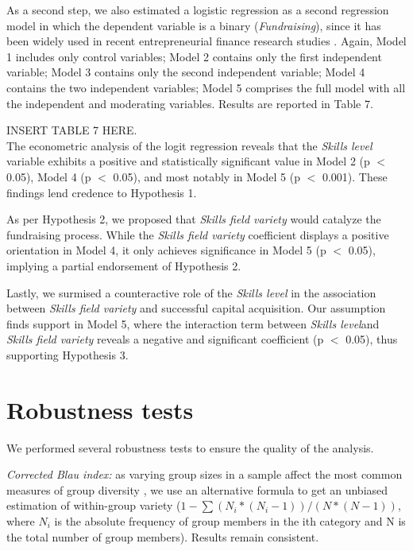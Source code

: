 \documentclass[12pt]{article}
\begin{document}
As a second step, we also estimated a logistic regression as a second regression model in which the dependent variable is a binary (\textit{Fundraising}), since it has been widely used in recent entrepreneurial finance research studies \citep{ahlers2015signaling, islam2018signaling}. Again, Model 1 includes only control variables; Model 2 contains only the first independent variable; Model 3 contains only the second independent variable; Model 4 contains the two independent variables; Model 5 comprises the full model with all the independent and moderating variables. Results are reported in Table 7\label{table7}.

INSERT TABLE 7 HERE. \\

The econometric analysis of the logit regression reveals that the \textit{Skills level} variable exhibits a positive and statistically significant value in Model 2 (p $<$ 0.05), Model 4 (p $<$ 0.05), and most notably in Model 5 (p $<$ 0.001). These findings lend credence to Hypothesis 1.

As per Hypothesis 2, we proposed that \textit{Skills field variety} would catalyze the fundraising process. While the \textit{Skills field variety} coefficient displays a positive orientation in Model 4, it only achieves significance in Model 5 (p $<$ 0.05), implying a partial endorsement of Hypothesis 2.

Lastly, we surmised a counteractive role of the \textit{Skills level} in the association between \textit{Skills field variety} and successful capital acquisition. Our assumption finds support in Model 5, where the interaction term between \textit{Skills level}and \textit{Skills field variety} reveals a negative and significant coefficient (p $<$  0.05), thus supporting Hypothesis 3.

\section{Robustness tests}

We performed several robustness tests to ensure the quality of the analysis.

\textit{Corrected Blau index:} as varying group sizes in a sample affect the most common measures of group diversity \citep{biemann2010size}, we use an alternative formula to get an unbiased estimation of within-group variety ($1 - \sum(N_i*(N_i - 1))/(N*(N - 1))$, where $N_i$ is the absolute frequency of group members in the ith category and N is the total number of group members). Results remain consistent.
\end{document}
